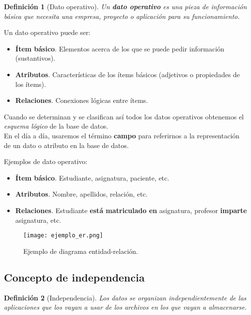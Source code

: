 \documentclass[12pt,spanish]{article}
\newtheorem{definition}{Definición}
\numberwithin{definition}{subsection}
\begin{document}
\begin{definition}[Dato operativo]
Un \textbf{dato operativo} es una pieza de información básica que necesita una empresa, proyecto o aplicación para su funcionamiento.
\end{definition}

Un dato operativo puede ser:
\begin{itemize}
	\item \textbf{Ítem básico}. Elementos acerca de los que se puede pedir información (sustantivos).
	\item \textbf{Atributos}. Características de los ítems básicos (adjetivos o propiedades de los ítems).
	\item \textbf{Relaciones}. Conexiones lógicas entre ítems.
\end{itemize}

Cuando se determinan y se clasifican así todos los datos operativos obtenemos el \emph{esquema lógico} de la base de datos.\\

En el día a día, usaremos el término \textbf{campo} para referirnos a la representación de un dato o atributo en la base de datos.

Ejemplos de dato operativo:

\begin{itemize}
	\item \textbf{Ítem básico}. Estudiante, asignatura, paciente, etc.
	\item \textbf{Atributos}. Nombre, apellidos, relación, etc.
	\item \textbf{Relaciones}. Estudiante \textbf{está matriculado en} asignatura, profesor \textbf{imparte} asignatura, etc.
\end{itemize}

\begin{figure}[H]
\centering
\texttt{[image: ejemplo\_er.png]}
\caption{Ejemplo de diagrama entidad-relación.}
\end{figure}

\subsection{Concepto de independencia}

\begin{definition}[Independencia]
	Los datos se organizan independientemente de las aplicaciones que los vayan a usar de los archivos en los que vayan a almacenarse.
\end{definition}
\end{document}
